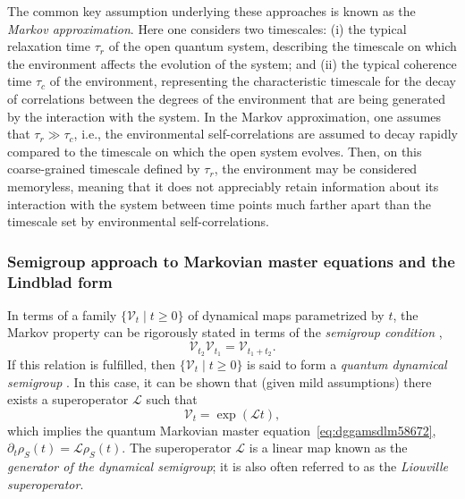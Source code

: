 \documentclass[3p,sort&compress,12pt]{elsarticle}
\newcommand{\op}[1]{#1}
\begin{document}
The common key assumption underlying these approaches is known as the \emph{Markov approximation}. Here one considers two timescales: (i) the typical relaxation time $\tau_r$ of the open quantum system, describing the timescale on which the environment affects the evolution of the system; and (ii) the typical coherence time $\tau_c$ of the environment, representing the characteristic timescale for the decay of correlations between the degrees of the environment that are being generated by the interaction with the system. In the Markov approximation, one assumes that $\tau_r \gg \tau_c$, i.e., the environmental self-correlations are assumed to decay rapidly compared to the timescale on which the open system evolves. Then, on this coarse-grained timescale defined by $\tau_r$, the environment may be considered memoryless, meaning that it does not appreciably retain information about its interaction with the system between time points much farther apart than the timescale set by environmental self-correlations. 

\subsubsection{\label{sec:semigr-deriv-mark}Semigroup approach to Markovian master equations and the Lindblad form}

In terms of a family $\{ \mathcal{V}_t \mid t \ge 0 \}$ of dynamical maps parametrized by $t$, the Markov property can be rigorously stated in terms of the \emph{semigroup condition} \cite{Lindblad:1976:um,Gorini:1976:tt,Gorini:1978:uf,Davies:1974:tw,Kossakowski:1972:tf,Alicki:2007:uu},
%
\begin{equation}
\label{eq:d4488m58672}
\mathcal{V}_{t_2}\mathcal{V}_{t_1}=\mathcal{V}_{t_1+t_2}.
\end{equation}
%
If this relation is fulfilled, then $\{ \mathcal{V}_t \mid t \ge 0 \}$ is said to form a \emph{quantum dynamical semigroup} \cite{Alicki:2007:uu}. In this case, it can be shown that  (given mild assumptions) there exists a superoperator $\mathcal{L}$ such that \cite{Alicki:2007:uu} 
%
\begin{equation}\label{eq:767n8m58672}
\mathcal{V}_t = \exp (\mathcal{L}t),
\end{equation}
%
which implies the quantum Markovian master equation~\eqref{eq:dggamsdlm58672}, $\partial_t \op{\rho}_S(t) = \mathcal{L}\op{\rho}_S(t)$.
The superoperator $\mathcal{L}$ is a linear map known as the \emph{generator of the dynamical semigroup}; it is also often referred to as the \emph{Liouville superoperator}.
\end{document}
